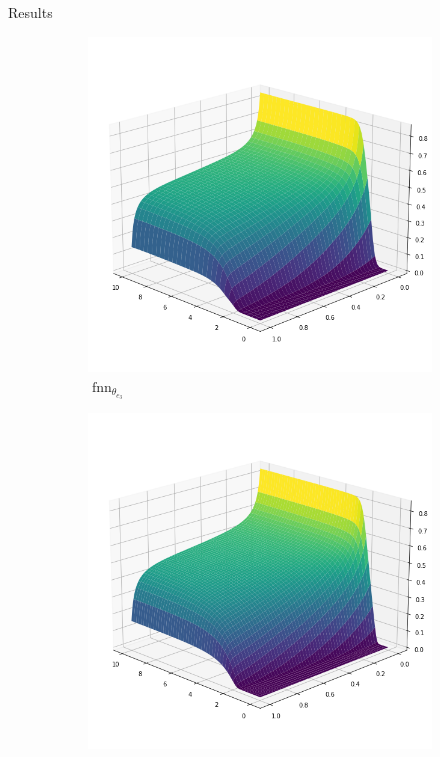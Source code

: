 \documentclass[9pt]{beamer}
\begin{document}
\begin{frame}{Results}
    \begin{figure}[H]
        \begin{center}
            \begin{subfigure}[b]{0.4\textwidth}
                \begin{center}
                    \includegraphics[scale=0.25]{img/Kante3.png}
                \end{center}
                \caption{$\operatorname{fnn}_{\theta_{e_3}}$}
            \end{subfigure} \hspace{10mm}
            \begin{subfigure}[b]{0.4\textwidth}
                \begin{center}
                    \includegraphics[scale=0.25]{img/FVM3.png}

\end{center}
\end{subfigure}
\end{center}
\end{figure}
\end{frame}
\end{document}
